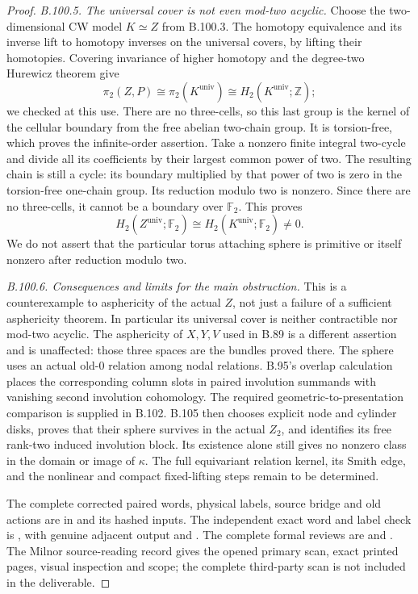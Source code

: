 \begin{proof}
\emph{B.100.5. The universal cover is not even mod-two acyclic.}
Choose the two-dimensional CW model $K\simeq Z$ from B.100.3.
The homotopy equivalence and its inverse lift to homotopy inverses
on the universal covers, by lifting their homotopies.  Covering
invariance of higher homotopy and the degree-two Hurewicz theorem
give
\[
 \pi_2(Z,P)\cong\pi_2(K^{\mathrm{univ}})
        \cong H_2(K^{\mathrm{univ}};\mathbb Z);
\]
we checked \citet[Proposition4.1, p.~342, and Theorem4.32 with
its proof, pp.~366--367]{BHatcher2002} at this use.
There are no three-cells, so this last group is the kernel of
the cellular boundary from the free abelian two-chain group.
It is torsion-free, which proves the infinite-order assertion.
Take a nonzero finite integral two-cycle and divide all its
coefficients by their largest common power of two.  The resulting
chain is still a cycle: its boundary multiplied by that power
of two is zero in the torsion-free one-chain group.  Its reduction
modulo two is nonzero.  Since there are no three-cells, it cannot
be a boundary over $\mathbb F_2$.  This proves
\[
 H_2(Z^{\mathrm{univ}};\mathbb F_2)
   \cong H_2(K^{\mathrm{univ}};\mathbb F_2)\ne0.
\]
We do not assert that the particular torus attaching sphere is
primitive or itself nonzero after reduction modulo two.

\emph{B.100.6. Consequences and limits for the main obstruction.}
This is a counterexample to asphericity of the actual $Z$, not
just a failure of a sufficient asphericity theorem.  In particular
its universal cover is neither contractible nor mod-two acyclic.
The asphericity of
$X,Y,V$ used in B.89 is a different assertion and is unaffected:
those three spaces are the bundles proved there.
The sphere uses an actual old-$0$ relation among nodal relations.
B.95's overlap calculation places the corresponding column slots in
paired involution summands with vanishing second involution cohomology.
The required geometric-to-presentation comparison is supplied in B.102.
B.105 then chooses explicit node and cylinder disks, proves that their
sphere survives in the actual $Z_2$, and identifies its free rank-two
induced involution block. Its existence alone still gives no nonzero
class in the domain or image of $\kappa$. The full equivariant relation
kernel, its Smith edge, and the nonlinear and compact fixed-lifting
steps remain to be determined.

\begingroup\raggedright
The complete corrected paired words, physical labels, source
bridge and old actions are in
and its hashed inputs.  The independent exact word and label
check is ,
with genuine adjacent output and
.
The complete formal reviews are
 and
.
The Milnor source-reading record gives
the opened primary scan, exact printed pages, visual inspection
and scope; the complete third-party scan is not included in the
deliverable.\par
\endgroup
\end{proof}
